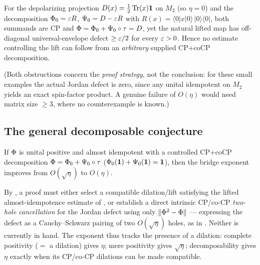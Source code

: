 \begin{proposition}\label{prop:sartre}
For the depolarizing projection $D(x)=\tfrac12\operatorname{Tr}(x)\mathbf{1}$ on $M_2$ (so $\eta=0$)
and the decomposition $\Phi_0=\varepsilon R$, $\Psi_0=D-\varepsilon R$ with
$R(x)=\langle0|x|0\rangle\,|0\rangle\langle0|$, both summands are CP and
$\Phi=\Phi_0+\Psi_0\circ\tau=D$, yet the natural lifted map has
off-diagonal universal-envelope defect $\ge\varepsilon/2$ for every $\varepsilon>0$. Hence no
estimate controlling the lift can follow from an \emph{arbitrary} supplied
CP+coCP decomposition.
\end{proposition}

\noindent (Both obstructions concern the \emph{proof strategy}, not the
conclusion: for these small examples the actual Jordan defect is zero, since any
unital idempotent on $M_2$ yields an exact spin-factor product. A genuine failure
of $O(\eta)$ would need matrix size $\ge3$, where no counterexample is known.)

\subsection{The general decomposable conjecture}

\begin{openproblem}\label{op:decomposable}
If $\Phi$ is unital positive and almost idempotent with a controlled CP+coCP
decomposition $\Phi=\Phi_0+\Psi_0\circ\tau$
($\Phi_0(\mathbf{1})+\Psi_0(\mathbf{1})=\mathbf{1}$), then the bridge exponent improves from
$O(\sqrt\eta)$ to $O(\eta)$.
\end{openproblem}

By , a proof must either
select a compatible dilation/lift satisfying the lifted almost-idempotence
estimate of , or establish a direct intrinsic
CP/co-CP \emph{two-hole cancellation} for the Jordan defect using only
$\lVert \Phi^2-\Phi \rVert$ --- expressing the defect as a Cauchy--Schwarz pairing
of two $O(\sqrt\eta)$ holes, as in . Neither is currently in
hand. The exponent thus tracks the presence of a dilation: complete positivity
($=$ a dilation) gives $\eta$; mere positivity gives $\sqrt\eta$; decomposability
gives $\eta$ exactly when its CP/co-CP dilations can be made compatible.
